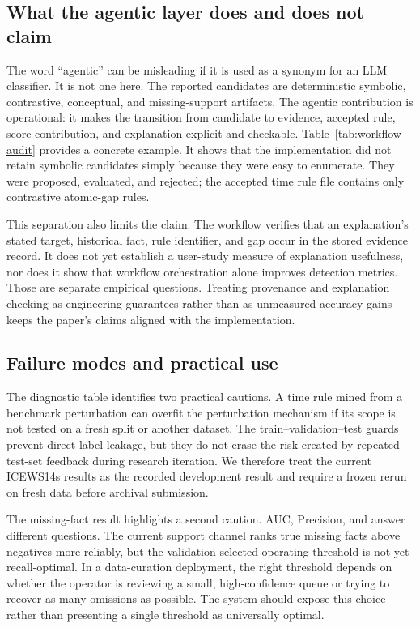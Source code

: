 \subsection{What the agentic layer does and does not claim}

The word ``agentic'' can be misleading if it is used as a synonym for an LLM classifier. It is not one here. The reported candidates are deterministic symbolic, contrastive, conceptual, and missing-support artifacts. The agentic contribution is operational: it makes the transition from candidate to evidence, accepted rule, score contribution, and explanation explicit and checkable. Table~\ref{tab:workflow-audit} provides a concrete example. It shows that the implementation did not retain symbolic candidates simply because they were easy to enumerate. They were proposed, evaluated, and rejected; the accepted time rule file contains only contrastive atomic-gap rules.

This separation also limits the claim. The workflow verifies that an explanation's stated target, historical fact, rule identifier, and gap occur in the stored evidence record. It does not yet establish a user-study measure of explanation usefulness, nor does it show that workflow orchestration alone improves detection metrics. Those are separate empirical questions. Treating provenance and explanation checking as engineering guarantees rather than as unmeasured accuracy gains keeps the paper's claims aligned with the implementation.

\subsection{Failure modes and practical use}

The diagnostic table identifies two practical cautions. A time rule mined from a benchmark perturbation can overfit the perturbation mechanism if its scope is not tested on a fresh split or another dataset. The train--validation--test guards prevent direct label leakage, but they do not erase the risk created by repeated test-set feedback during research iteration. We therefore treat the current ICEWS14s results as the recorded development result and require a frozen rerun on fresh data before archival submission.

The missing-fact result highlights a second caution. AUC, Precision, and \fbeta answer different questions. The current support channel ranks true missing facts above negatives more reliably, but the validation-selected operating threshold is not yet recall-optimal. In a data-curation deployment, the right threshold depends on whether the operator is reviewing a small, high-confidence queue or trying to recover as many omissions as possible. The system should expose this choice rather than presenting a single threshold as universally optimal.

